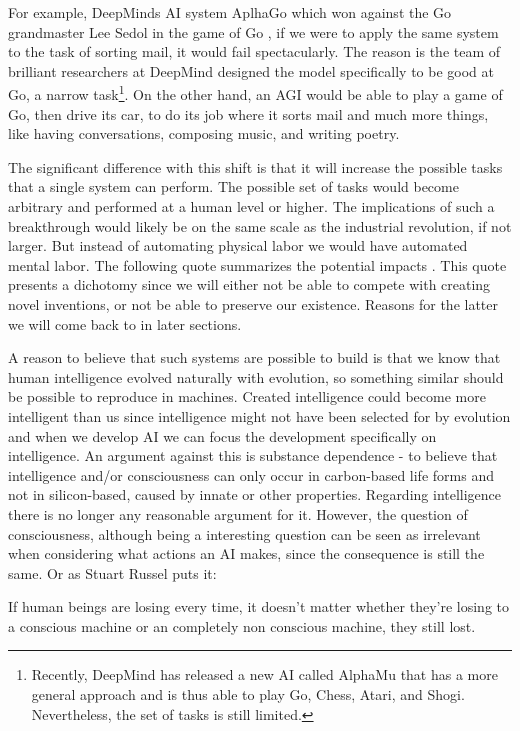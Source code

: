 \documentclass[12pt,A4]{report}
\theoremstyle{definition}
\begin{document}
For example, DeepMinds AI system AplhaGo which won against the Go grandmaster Lee Sedol in the game of Go \autocite{DeepMind}, if we were to apply the same system to the task of sorting mail, it would fail spectacularly. The reason is the team of brilliant researchers at DeepMind designed the model specifically to be good at Go, a narrow task\footnote{Recently, DeepMind has released a new AI called AlphaMu that has a more general approach and is thus able to play Go, Chess, Atari, and Shogi\autocite{Deepmind2}. Nevertheless, the set of tasks is still limited.}. On the other hand, an AGI would be able to play a game of Go, then drive its car, to do its job where it sorts mail and much more things, like having conversations, composing music, and writing poetry.

The significant difference with this shift is that it will increase the possible tasks that a single system can perform. The possible set of tasks would become arbitrary and performed at a human level or higher. The implications of such a breakthrough would likely be on the same scale as the industrial revolution, if not larger\autocite{Critch Kruger}. But instead of automating physical labor we would have automated mental labor. The following quote summarizes the potential impacts \autocite{I.J Good}. This quote presents a dichotomy since we will either not be able to compete with creating novel inventions, or not be able to preserve our existence. Reasons for the latter we will come back to in later sections. 

A reason to believe that such systems are possible to build is that we know that human intelligence evolved naturally with evolution, so something similar should be possible to reproduce in machines. Created intelligence could become more intelligent than us since intelligence might not have been selected for by evolution\autocite{S. Legg} and when we develop AI we can focus the development specifically on intelligence. An argument against this is substance dependence \autocite{Bostrom (2003)} - to believe that intelligence and/or consciousness can only occur in carbon-based life forms and not in silicon-based, caused by innate or other properties. Regarding intelligence there is no longer any reasonable argument for it. However, the question of consciousness, although being a interesting question can be seen as irrelevant when considering what actions an AI makes, since the consequence is still the same. Or as Stuart Russel puts it: 
\begin{displayquote}
If human beings are losing every time, it doesn't matter whether they're losing to a conscious machine or an completely non conscious machine, they still lost.
\end{displayquote}
\end{document}
